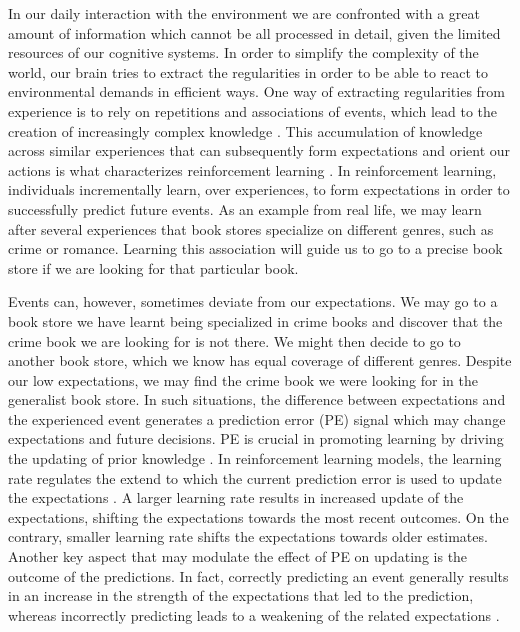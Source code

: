 \documentclass[a4paper,12pt]{article}
\begin{document}

In our daily interaction with the environment we are confronted with a great amount of information which cannot be all processed in detail, given the limited resources of our cognitive systems. In order to simplify the complexity of the world, our brain tries to extract the regularities in order to be able to react to environmental demands in efficient ways. One way of extracting regularities from experience is to rely on repetitions and associations of events, which lead to the creation of increasingly complex knowledge \citep{Ghosh2014, Tse2007}. This accumulation of knowledge across similar experiences that can subsequently form expectations and orient our actions is what characterizes reinforcement learning \citep{Sutton1998}. In reinforcement learning, individuals incrementally learn, over experiences, to form expectations in order to successfully predict future events. As an example from real life, we may learn after several experiences that book stores specialize on different genres, such as crime or romance. Learning this association will guide us to go to a precise book store if we are looking for that particular book. \par 
Events can, however, sometimes deviate from our expectations. We may go to a book store we have learnt being specialized in crime books and discover that the crime book we are looking for is not there. We might then decide to go to another book store, which we know has equal coverage of different genres. Despite our low expectations, we may find the crime book we were looking for in the generalist book store. In such situations, the difference between expectations and the experienced event generates a prediction error (PE) signal which may change expectations and future decisions. PE is crucial in promoting learning by driving the updating of prior knowledge \citep{Ergo2020, Friston2018}. In reinforcement learning models, the learning rate regulates the extend to which the current prediction error is used to update the expectations \citep{Sutton2018a}. A larger learning rate results in increased update of the expectations, shifting the expectations towards the most recent outcomes. On the contrary, smaller learning rate shifts the expectations towards older estimates. Another key aspect that may modulate the effect of PE on updating is the outcome of the predictions. In fact, correctly predicting an event generally results in an increase in the strength of the expectations that led to the prediction, whereas incorrectly predicting leads to a weakening of the related expectations  \citep{Daw2013}. %
\end{document}
